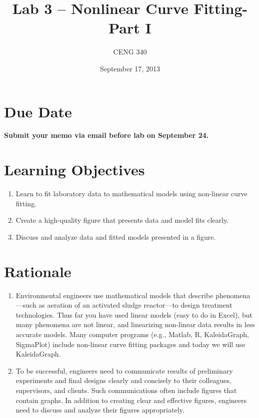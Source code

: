 \documentclass[12pt,letterpaper]{article}
\begin{document}
\setlength{\parindent}{0cm} 


\frenchspacing

\title {\textbf{Lab 3 -- Nonlinear Curve Fitting-Part I}} 

\author {CENG 340}
\date {September 17, 2013}
\maketitle

\section *{Due Date}
\textbf{ Submit your memo via email before lab on September 24.} 

\section *{Learning Objectives}
\begin{enumerate}
\item Learn to fit laboratory data to mathematical models using non-linear curve fitting.\
\item Create a high-quality figure that presents data and model fits clearly.\
\item Discuss and analyze data and fitted models presented in a figure.\ 
\end{enumerate}

\section *{Rationale}
\begin{enumerate}
\item Environmental engineers use mathematical models that describe phenomena---such as aeration of an activated sludge reactor---to design treatment technologies.  Thus far you have used linear models (easy to do in Excel), but many phenomena are not linear, and linearizing non-linear data results in less accurate models.  Many computer programs (e.g., Matlab, R, KaleidaGraph, SigmaPlot) include non-linear curve fitting packages and today we will use KaleidaGraph.  
\item To be successful, engineers need to communicate results of preliminary experiments and final designs clearly and concisely to their colleagues, supervisors, and clients.  Such communications often include figures that contain graphs.  In addition to creating clear and effective figures, engineers need to discuss and analyze their figures appropriately. 
\end{enumerate}
 
\end{document}
